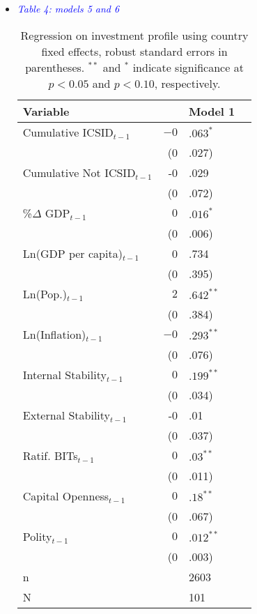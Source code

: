 \begin{enumerate}
\begin{itemize}
		\item \textcolor{blue}{ \emph{ Table 4: models 5 and 6 }}

			\begin{table}[ht]
			\centering
			\begingroup\footnotesize
			\begin{tabular}{lr@{}lr@{}}
			 Variable && Model 1 \\ 
			  \hline
			\hline
			Cumulative ICSID$_{t-1}$ & $-0$&$.063^{\ast}$ \\ 
			   & (0&.027) \\ 
			  Cumulative Not ICSID$_{t-1}$ & -0&.029 \\ 
			   & (0&.072) \\ 
			  \%$\Delta$ GDP$_{t-1}$ & $0$&$.016^{\ast}$ \\ 
			   & (0&.006) \\ 
			  Ln(GDP per capita)$_{t-1}$ & 0&.734 \\ 
			   & (0&.395) \\ 
			  Ln(Pop.)$_{t-1}$ & $2$&$.642^{\ast\ast}$ \\ 
			   & (0&.384) \\ 
			  Ln(Inflation)$_{t-1}$ & $-0$&$.293^{\ast\ast}$ \\ 
			   & (0&.076) \\ 
			  Internal Stability$_{t-1}$ & $0$&$.199^{\ast\ast}$ \\ 
			   & (0&.034) \\ 
			  External Stability$_{t-1}$ & -0&.01 \\ 
			   & (0&.037) \\ 
			  Ratif. BITs$_{t-1}$ & $0$&$.03^{\ast\ast}$ \\ 
			   & (0&.011) \\ 
			  Capital Openness$_{t-1}$ & $0$&$.18^{\ast\ast}$ \\ 
			   & (0&.067) \\ 
			  Polity$_{t-1}$ & $0$&$.012^{\ast\ast}$ \\ 
			   & (0&.003) \\ 
			   \hline
			n && 2603 \\ 
			  N && 101 \\ 
			   \hline
			\hline
			\end{tabular}
			\endgroup
			\caption{Regression on investment profile using country fixed effects, robust standard errors in parentheses. $^{**}$ and $^{*}$ indicate significance at $p< 0.05 $ and $p< 0.10 $, respectively.} 
			\end{table}		
			\FloatBarrier


\end{itemize}
\end{enumerate}
